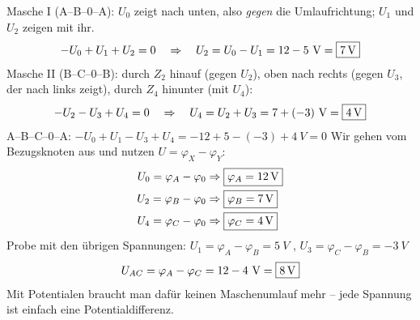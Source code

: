 \documentclass[11pt,a4paper]{article}
\begin{document}
\begin{loesung}
Masche I (A--B--0--A): $U_0$ zeigt nach unten, also \emph{gegen} die Umlaufrichtung; $U_1$ und $U_2$ zeigen mit ihr.
\[
  -U_0 + U_1 + U_2 = 0 \quad\Rightarrow\quad U_2 = U_0 - U_1 = 12 - 5\ \si{V} = \ergebnis{\SI{7}{V}}
\]
Masche II (B--C--0--B): durch $Z_2$ hinauf (gegen $U_2$), oben nach rechts (gegen $U_3$, der nach links zeigt), durch $Z_4$ hinunter (mit $U_4$):
\[
  -U_2 - U_3 + U_4 = 0 \quad\Rightarrow\quad U_4 = U_2 + U_3 = 7 + (-3)\ \si{V} = \ergebnis{\SI{4}{V}}
\]
A--B--C--0--A: $-U_0 + U_1 - U_3 + U_4 = -12 + 5 - (-3) + 4\ \si{V} = 0$ \checkmark
{}
Wir gehen vom Bezugsknoten aus und nutzen $U = \varphi_X - \varphi_Y$:
\begin{align*}
  U_0 = \varphi_A - \varphi_0 &\Rightarrow \ergebnis{\varphi_A = \SI{12}{V}}\\
  U_2 = \varphi_B - \varphi_0 &\Rightarrow \ergebnis{\varphi_B = \SI{7}{V}}\\
  U_4 = \varphi_C - \varphi_0 &\Rightarrow \ergebnis{\varphi_C = \SI{4}{V}}
\end{align*}
Probe mit den übrigen Spannungen: $U_1 = \varphi_A - \varphi_B = \SI{5}{V}$ \checkmark, $U_3 = \varphi_C - \varphi_B = \SI{-3}{V}$ \checkmark
{}
\[
  U_{AC} = \varphi_A - \varphi_C = 12 - 4\ \si{V} = \ergebnis{\SI{8}{V}}
\]
Mit Potentialen braucht man dafür keinen Maschenumlauf mehr -- jede Spannung ist einfach eine Potentialdifferenz.
\end{loesung}
\end{document}
